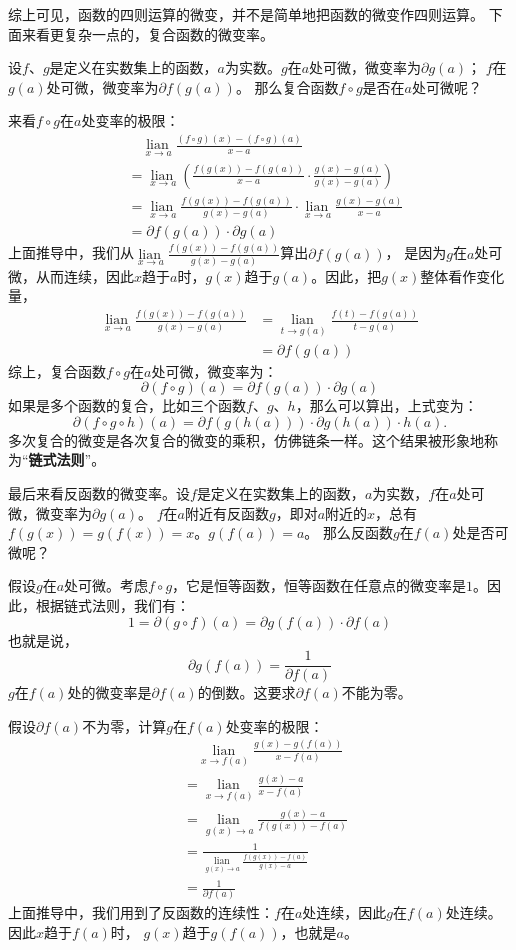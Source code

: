 \documentclass[12pt,UTF8]{ctexbook}
\newcommand{\lian}[1]{
    \underset{#1}{\operatorname{lian}\,}
}
\begin{document}
综上可见，函数的四则运算的微变，并不是简单地把函数的微变作四则运算。
下面来看更复杂一点的，复合函数的微变率。

设$f$、$g$是定义在实数集上的函数，$a$为实数。$g$在$a$处可微，微变率为$\partial g(a)$；
$f$在$g(a)$处可微，微变率为$\partial f(g(a))$。
那么复合函数$f\circ g$是否在$a$处可微呢？

来看$f\circ g$在$a$处变率的极限：
\begin{align*}
    & \quad \lian{x\to a} \frac{(f \circ g)(x) - (f \circ g)(a)}{x - a}  \\
    &= \lian{x\to a} \left(\frac{f(g(x)) - f(g(a))}{x - a} \cdot \frac{g(x) - g(a)}{g(x) - g(a)}\right)  \\
    &= \lian{x\to a} \frac{f(g(x)) - f(g(a))}{g(x) - g(a)} \cdot \lian{x\to a} \frac{g(x) - g(a)}{x - a}  \\
    &= \partial f(g(a)) \cdot \partial g(a)  
\end{align*}
上面推导中，我们从$\lian{x\to a} \frac{f(g(x)) - f(g(a))}{g(x) - g(a)}$算出$\partial f(g(a))$，
是因为$g$在$a$处可微，从而连续，因此$x$趋于$a$时，$g(x)$趋于$g(a)$。因此，把$g(x)$整体看作变化量，
\begin{align*}
    \lian{x\to a} \frac{f(g(x)) - f(g(a))}{g(x) - g(a)} &= \lian{t\to g(a)} \frac{f(t) - f(g(a))}{t - g(a)}  \\
    &= \partial f(g(a))  
\end{align*}
综上，复合函数$f\circ g$在$a$处可微，微变率为：
$$ \partial (f\circ g) (a) = \partial f(g(a)) \cdot \partial g(a)$$
如果是多个函数的复合，比如三个函数$f$、$g$、$h$，那么可以算出，上式变为：
$$ \partial (f\circ g \circ h) (a) = \partial f(g(h(a))) \cdot \partial g(h(a)) \cdot h(a).$$
多次复合的微变是各次复合的微变的乘积，仿佛链条一样。这个结果被形象地称为“\textbf{链式法则}”。

最后来看反函数的微变率。设$f$是定义在实数集上的函数，$a$为实数，$f$在$a$处可微，微变率为$\partial g(a)$。
$f$在$a$附近有反函数$g$，即对$a$附近的$x$，总有$f(g(x)) = g(f(x)) = x$。$g(f(a)) = a$。
那么反函数$g$在$f(a)$处是否可微呢？

假设$g$在$a$处可微。考虑$f\circ g$，它是恒等函数，恒等函数在任意点的微变率是$1$。因此，根据链式法则，我们有：
$$ 1 = \partial (g\circ f) (a) = \partial g(f(a)) \cdot \partial f(a)$$
也就是说，
$$ \partial g(f(a)) = \frac{1}{\partial f(a)} $$
$g$在$f(a)$处的微变率是$\partial f(a)$的倒数。这要求$\partial f(a)$不能为零。

假设$\partial f(a)$不为零，计算$g$在$f(a)$处变率的极限：
\begin{align*}
    & \quad \lian{x\to f(a)} \frac{g(x) - g(f(a))}{x - f(a)}  \\
    &= \lian{x\to f(a)} \frac{g(x) - a}{x - f(a)}  \\
    &= \lian{g(x)\to a} \frac{g(x) - a}{f(g(x)) - f(a)}  \\
    &= \frac{1}{\lian{g(x)\to a}\frac{f(g(x)) - f(a)}{g(x) - a}}  \\
    &= \frac{1}{\partial f(a)} 
\end{align*}
上面推导中，我们用到了反函数的连续性：$f$在$a$处连续，因此$g$在$f(a)$处连续。因此$x$趋于$f(a)$时，
$g(x)$趋于$g(f(a))$，也就是$a$。
\end{document}
